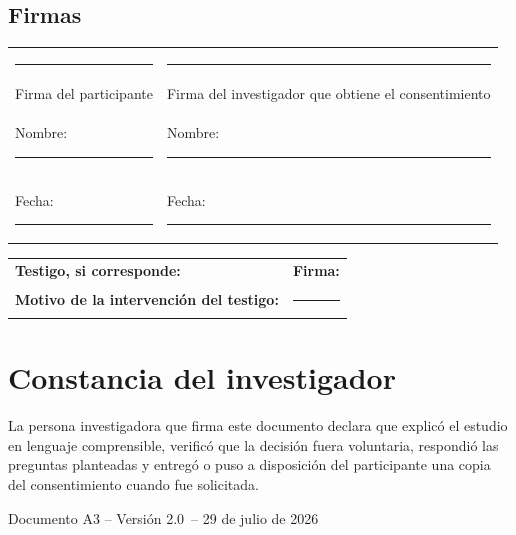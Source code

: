 \documentclass[10pt,a4paper]{article}
\newcommand{\FechaDocumento}{29 de julio de 2026}
\newcommand{\VersionDocumento}{2.0}
\begin{document}
\subsection{Firmas}

\vspace{0.8cm}
\noindent\begin{tabularx}{\textwidth}{@{}Y Y@{}}
\centering\rule{0.84\linewidth}{0.4pt} & \centering\arraybackslash\rule{0.84\linewidth}{0.4pt}\\
\centering Firma del participante & \centering\arraybackslash Firma del investigador que obtiene el consentimiento\\[4pt]
\centering Nombre: \rule{0.58\linewidth}{0.4pt} & \centering\arraybackslash Nombre: \rule{0.58\linewidth}{0.4pt}\\[4pt]
\centering Fecha: \rule{0.48\linewidth}{0.4pt} & \centering\arraybackslash Fecha: \rule{0.48\linewidth}{0.4pt}
\end{tabularx}

\vspace{0.9cm}
\noindent\begin{tabularx}{\textwidth}{@{}Y Y@{}}
\textbf{Testigo, si corresponde:} \hrulefill & \textbf{Firma:} \hrulefill \\
\addlinespace[0.8cm]
\textbf{Motivo de la intervención del testigo:} & \rule{0.85\linewidth}{0.4pt}
\end{tabularx}

\section{Constancia del investigador}

La persona investigadora que firma este documento declara que explicó el estudio en lenguaje comprensible, verificó que la decisión fuera voluntaria, respondió las preguntas planteadas y entregó o puso a disposición del participante una copia del consentimiento cuando fue solicitada.

\vfill
\begin{center}
{\small Documento A3 -- Versión \VersionDocumento\ -- \FechaDocumento}
\end{center}
\end{document}
